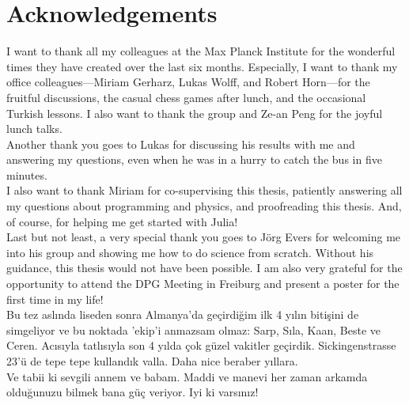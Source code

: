 \chapter*{Acknowledgements}

I want to thank all my colleagues at the Max Planck Institute for the wonderful times they have created over the last six months. Especially, I want to thank my office colleagues—Miriam Gerharz, Lukas Wolff, and Robert Horn—for the fruitful discussions, the casual chess games after lunch, and the occasional Turkish lessons. I also want to thank the group and Ze-an Peng for the joyful lunch talks.\\

Another thank you goes to Lukas for discussing his results with me and answering my questions, even when he was in a hurry to catch the bus in five minutes.\\

I also want to thank Miriam for co-supervising this thesis, patiently answering all my questions about programming and physics, and proofreading this thesis. And, of course, for helping me get started with Julia!\\

Last but not least, a very special thank you goes to Jörg Evers for welcoming me into his group and showing me how to do science from scratch. Without his guidance, this thesis would not have been possible. I am also very grateful for the opportunity to attend the DPG Meeting in Freiburg and present a poster for the first time in my life!\\

Bu tez aslında liseden sonra Almanya'da geçirdiğim ilk 4 yılın bitişini de simgeliyor ve bu noktada 'ekip'i anmazsam olmaz: Sarp, Sıla, Kaan, Beste ve Ceren. Acısıyla tatlısıyla son 4 yılda çok güzel vakitler geçirdik. Sickingenstrasse 23'ü de tepe tepe kullandık valla. Daha nice beraber yıllara.\\

Ve tabii ki sevgili annem ve babam. Maddi ve manevi her zaman arkamda olduğunuzu bilmek bana güç veriyor. Iyi ki varsınız!